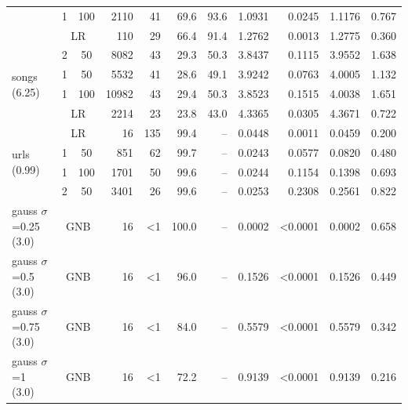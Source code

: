 \begin{tabular}{l ccr rrrrrrr}
                                            &                 1 & 100 &  2110 &  41 &  69.6 & 93.6 & 1.0931 &  0.0245 & 1.1176 & 0.767 \\
                                            &  \multicolumn{2}{c}{LR} &   110 &  29 &  66.4 & 91.4 & 1.2762 &  0.0013 & 1.2775 & 0.360 \\
      \midrule\multirow{4}{*}{songs (6.25)} &                  2 & 50 &  8082 &  43 &  29.3 & 50.3 & 3.8437 &  0.1115 & 3.9552 & 1.638 \\
                                            &                  1 & 50 &  5532 &  41 &  28.6 & 49.1 & 3.9242 &  0.0763 & 4.0005 & 1.132 \\
                                            &                 1 & 100 & 10982 &  43 &  29.4 & 50.3 & 3.8523 &  0.1515 & 4.0038 & 1.651 \\
                                            &  \multicolumn{2}{c}{LR} &  2214 &  23 &  23.8 & 43.0 & 4.3365 &  0.0305 & 4.3671 & 0.722 \\
       \midrule\multirow{4}{*}{urls (0.99)} &  \multicolumn{2}{c}{LR} &    16 & 135 &  99.4 &   -- & 0.0448 &  0.0011 & 0.0459 & 0.200 \\
                                            &                  1 & 50 &   851 &  62 &  99.7 &   -- & 0.0243 &  0.0577 & 0.0820 & 0.480 \\
                                            &                 1 & 100 &  1701 &  50 &  99.6 &   -- & 0.0244 &  0.1154 & 0.1398 & 0.693 \\
                                            &                  2 & 50 &  3401 &  26 &  99.6 &   -- & 0.0253 &  0.2308 & 0.2561 & 0.822 \\
         \midrule gauss $\sigma$=0.25 (3.0) & \multicolumn{2}{c}{GNB} &    16 &  <1 & 100.0 &   -- & 0.0002 & <0.0001 & 0.0002 & 0.658 \\
                   gauss $\sigma$=0.5 (3.0) & \multicolumn{2}{c}{GNB} &    16 &  <1 &  96.0 &   -- & 0.1526 & <0.0001 & 0.1526 & 0.449 \\
                  gauss $\sigma$=0.75 (3.0) & \multicolumn{2}{c}{GNB} &    16 &  <1 &  84.0 &   -- & 0.5579 & <0.0001 & 0.5579 & 0.342 \\
                     gauss $\sigma$=1 (3.0) & \multicolumn{2}{c}{GNB} &    16 &  <1 &  72.2 &   -- & 0.9139 & <0.0001 & 0.9139 & 0.216 \\

		\bottomrule

	\end{tabular}

